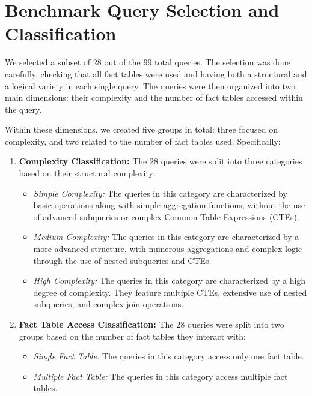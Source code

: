 \documentclass[conference]{IEEEtran}
\begin{document}
\section{Benchmark Query Selection and Classification}\label{query_selection}

We selected a subset of 28 out of the 99 total queries. The selection was done carefully, checking that all fact tables were used and having both a structural and a logical variety in each single query. The queries were then organized into two main dimensions: their complexity and the number of fact tables accessed within the query.

Within these dimensions, we created five groups in total: three focused on complexity, and two related to the number of fact tables used. Specifically:

\begin{enumerate}
    \item \textbf{Complexity Classification:} The 28 queries were split into three categories based on their structural complexity:
          \begin{itemize}
              \item \textit{Simple Complexity:} The queries in this category are characterized by basic operations along with simple aggregation functions, without the use of advanced subqueries or complex Common Table Expressions (CTEs).
              \item \textit{Medium Complexity:} The queries in this category are characterized by a more advanced structure, with numerous aggregations and complex logic through the use of nested subqueries and CTEs.
              \item \textit{High Complexity:} The queries in this category are characterized by a high degree of complexity. They feature multiple CTEs, extensive use of nested subqueries, and complex join operations.
          \end{itemize}
    \item \textbf{Fact Table Access Classification:} The 28 queries were split into two groups based on the number of fact tables they interact with:
          \begin{itemize}
              \item \textit{Single Fact Table:} The queries in this category access only one fact table.
              \item \textit{Multiple Fact Table:} The queries in this category access multiple fact tables.
          \end{itemize}
\end{enumerate}
\end{document}
